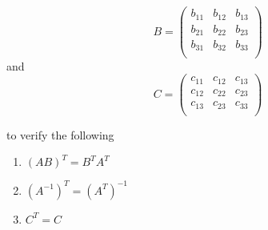 \documentclass[12pt]{article}
\begin{document}
\begin{equation}
    B   = 
    \begin{pmatrix}
        b_{11}  &   b_{12}  &   b_{13}  \\
        b_{21}  &   b_{22}  &   b_{23}  \\
        b_{31}  &   b_{32}  &   b_{33}  \\
    \end{pmatrix}
\end{equation}
and 
\begin{equation}
    C   = 
    \begin{pmatrix}
        c_{11}  &   c_{12}  &   c_{13}  \\
        c_{12}  &   c_{22}  &   c_{23}  \\
        c_{13}  &   c_{23}  &   c_{33}  \\
    \end{pmatrix}
\end{equation}

to verify the following
\begin{enumerate}[label=(\alph*)]
    \item $\left(AB\right)^{T} = B^{T} A^{T}$ 
    \item $\left(A^{-1}\right)^{T} = \left(A^{T}\right)^{-1}$  
    \item $C^{T} = C$
\end{enumerate}
    
\end{document}
